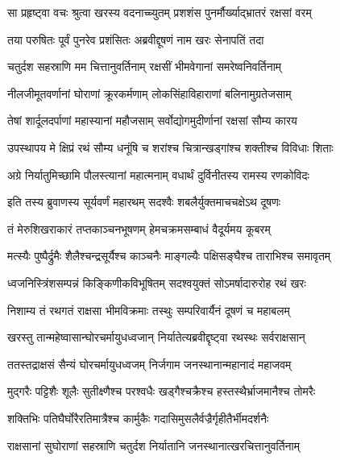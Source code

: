 \twolineshloka
{सा प्रहृष्ट्वा वचः श्रुत्वा खरस्य वदनाच्च्युतम्}
{प्रशशंस पुनर्मौर्ख्याद्भ्रातरं रक्षसां वरम्} %

\twolineshloka
{तया परुषितः पूर्वं पुनरेव प्रशंसितः}
{अब्रवीद्दूषणं नाम खरः सेनापतिं तदा} %

\twolineshloka
{चतुर्दश सहस्राणि मम चित्तानुवर्तिनाम्}
{रक्षसीं भीमवेगानां समरेष्वनिवर्तिनाम्} %

\twolineshloka
{नीलजीमूतवर्णानां घोराणां क्रूरकर्मणाम्}
{लोकसिंहाविहाराणां बलिनामुग्रतेजसाम्} %

\twolineshloka
{तेषां शार्दूलदर्पाणां महास्यानां महौजसाम्}
{सर्वोद्योगमुदीर्णानां रक्षसां सौम्य कारय} %

\twolineshloka
{उपस्थापय मे क्षिप्रं रथं सौम्य धनूंषि च}
{शरांश्च चित्रान्खड्गांश्च शक्तीश्च विविधाः शिताः} %

\twolineshloka
{अग्रे निर्यातुमिच्छामि पौलस्त्यानां महात्मनाम्}
{वधार्थं दुर्विनीतस्य रामस्य रणकोविदः} %

\twolineshloka
{इति तस्य ब्रुवाणस्य सूर्यवर्णं महारथम्}
{सदश्वैः शबलैर्युक्तमाचचक्षेऽथ दूषणः} %

\twolineshloka
{तं मेरुशिखराकारं तप्तकाञ्चनभूषणम्}
{हेमचक्रमसम्बाधं वैदूर्यमय कूबरम्} %

\twolineshloka
{मत्स्यैः पुष्पैर्द्रुमैः शैलैश्चन्द्रसूर्यैश्च काञ्चनैः}
{माङ्गल्यैः पक्षिसङ्घैश्च ताराभिश्च समावृतम्} %

\twolineshloka
{ध्वजनिस्त्रिंशसम्पन्नं किङ्किणीकविभूषितम्}
{सदश्वयुक्तं सोऽमर्षादारुरोह रथं खरः} %

\twolineshloka
{निशाम्य तं रथगतं राक्षसा भीमविक्रमाः}
{तस्थुः सम्परिवार्यैनं दूषणं च महाबलम्} %

\twolineshloka
{खरस्तु तान्महेष्वासान्घोरचर्मायुधध्वजान्}
{निर्यातेत्यब्रवीद्दृष्ट्वा रथस्थः सर्वराक्षसान्} %

\twolineshloka
{ततस्तद्राक्षसं सैन्यं घोरचर्मायुधध्वजम्}
{निर्जगाम जनस्थानान्महानादं महाजवम्} %

\twolineshloka
{मुद्गरैः पट्टिशैः शूलैः सुतीक्ष्णैश्च परश्वधैः}
{खड्गैश्चक्रैश्च हस्तस्थैर्भ्राजमानैश्च तोमरैः} %

\twolineshloka
{शक्तिभिः पतिघैर्घोरैरतिमात्रैश्च कार्मुकैः}
{गदासिमुसलैर्वज्रैर्गृहीतैर्भीमदर्शनैः} %

\twolineshloka
{राक्षसानां सुघोराणां सहस्राणि चतुर्दश}
{निर्यातानि जनस्थानात्खरचित्तानुवर्तिनाम्} %

